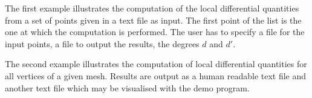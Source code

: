 The first example illustrates the computation of the local
differential quantities from a set of points given in a text file as
input. The first point of the list is the one at which the computation
is performed. The user has to specify a file for the input points, a
file to output the results, the degrees $d$ and $d'$.

The second example illustrates the computation of local differential
quantities for all vertices of a given mesh. Results are output as a
human readable text file and another text file which may be visualised 
with the demo program.
